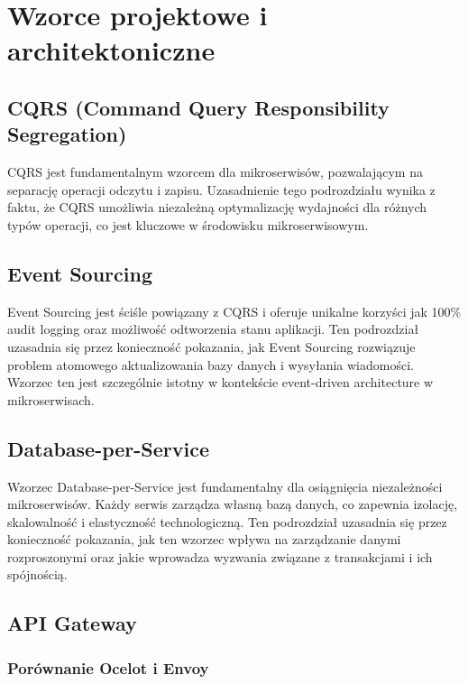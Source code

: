 \cleardoublepage

\chapter{Wzorce projektowe i architektoniczne}
\label{cha:WzorceProjektowe}

\section{CQRS (Command Query Responsibility Segregation)}
\label{sec:CQRS}

CQRS jest fundamentalnym wzorcem dla mikroserwisów, pozwalającym na separację operacji odczytu i zapisu. Uzasadnienie tego podrozdziału wynika z faktu, że CQRS umożliwia niezależną optymalizację wydajności dla różnych typów operacji, co jest kluczowe w środowisku mikroserwisowym.

\section{Event Sourcing}
\label{sec:EventSourcing}

Event Sourcing jest ściśle powiązany z CQRS i oferuje unikalne korzyści jak 100\% audit logging oraz możliwość odtworzenia stanu aplikacji. Ten podrozdział uzasadnia się przez konieczność pokazania, jak Event Sourcing rozwiązuje problem atomowego aktualizowania bazy danych i wysyłania wiadomości. Wzorzec ten jest szczególnie istotny w kontekście event-driven architecture w mikroserwisach.

\section{Database-per-Service}
\label{sec:DatabasePerService}

Wzorzec Database-per-Service jest fundamentalny dla osiągnięcia niezależności mikroserwisów. Każdy serwis zarządza własną bazą danych, co zapewnia izolację, skalowalność i elastyczność technologiczną. Ten podrozdział uzasadnia się przez konieczność pokazania, jak ten wzorzec wpływa na zarządzanie danymi rozproszonymi oraz jakie wprowadza wyzwania związane z transakcjami i ich spójnością.

\section{API Gateway}
\label{sec:APIGateway}

\subsection{Porównanie Ocelot i Envoy}
\label{subsec:PorowanieOcelotEnvoy}

